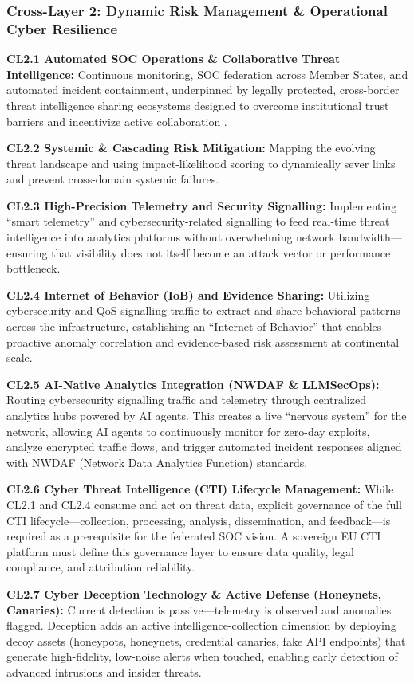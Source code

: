 \documentclass[12pt,a4paper]{article}
\begin{document}
\subsubsection*{Cross-Layer 2: Dynamic Risk Management \& Operational Cyber Resilience}
\textbf{CL2.1 Automated SOC Operations \& Collaborative Threat Intelligence:} Continuous monitoring, SOC federation across Member States, and automated incident containment, underpinned by legally protected, cross-border threat intelligence sharing ecosystems designed to overcome institutional trust barriers and incentivize active collaboration \cite{concordia}.

\textbf{CL2.2 Systemic \& Cascading Risk Mitigation:} Mapping the evolving threat landscape and using impact-likelihood scoring to dynamically sever links and prevent cross-domain systemic failures.

\textbf{CL2.3 High-Precision Telemetry and Security Signalling:} Implementing ``smart telemetry'' and cybersecurity-related signalling to feed real-time threat intelligence into analytics platforms without overwhelming network bandwidth---ensuring that visibility does not itself become an attack vector or performance bottleneck.

\textbf{CL2.4 Internet of Behavior (IoB) and Evidence Sharing:} Utilizing cybersecurity and QoS signalling traffic to extract and share behavioral patterns across the infrastructure, establishing an ``Internet of Behavior'' that enables proactive anomaly correlation and evidence-based risk assessment at continental scale.

\textbf{CL2.5 AI-Native Analytics Integration (NWDAF \& LLMSecOps):} Routing cybersecurity signalling traffic and telemetry through centralized analytics hubs powered by AI agents. This creates a live ``nervous system'' for the network, allowing AI agents to continuously monitor for zero-day exploits, analyze encrypted traffic flows, and trigger automated incident responses aligned with NWDAF (Network Data Analytics Function) standards.

\textbf{CL2.6 Cyber Threat Intelligence (CTI) Lifecycle Management:} While CL2.1 and CL2.4 consume and act on threat data, explicit governance of the full CTI lifecycle---collection, processing, analysis, dissemination, and feedback---is required as a prerequisite for the federated SOC vision. A sovereign EU CTI platform must define this governance layer to ensure data quality, legal compliance, and attribution reliability.

\textbf{CL2.7 Cyber Deception Technology \& Active Defense (Honeynets, Canaries):} Current detection is passive---telemetry is observed and anomalies flagged. Deception adds an active intelligence-collection dimension by deploying decoy assets (honeypots, honeynets, credential canaries, fake API endpoints) that generate high-fidelity, low-noise alerts when touched, enabling early detection of advanced intrusions and insider threats.
\end{document}
